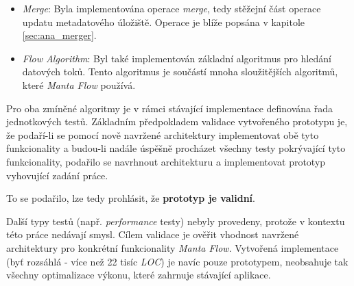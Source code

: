 \begin{itemize}
   \item{\textit{Merge}}: Byla implementována operace \textit{merge}, tedy stěžejní část operace updatu metadatového úložiště. Operace je blíže popsána v kapitole \ref{sec:ana_merger}.
   \item{\textit{Flow Algorithm}}: Byl také implementován základní algoritmus pro hledání datových toků. Tento algoritmus je součástí mnoha sloužitějších algoritmů, které \textit{Manta Flow} používá.
\end{itemize}

Pro oba zmíněné algoritmy je v rámci stávající implementace definována řada jednotkových testů. Základním předpokladem validace vytvořeného prototypu je, že podaří-li se pomocí nově navržené architektury implementovat obě tyto funkcionality a budou-li nadále úspěšně procházet všechny testy pokrývající tyto funkcionality, podařilo se navrhnout architekturu a implementovat prototyp vyhovující zadání práce.

To se podařilo, lze tedy prohlásit, že \textbf{prototyp je validní}.

Další typy testů (např. \textit{performance} testy) nebyly provedeny, protože v kontextu této práce nedávají smysl. Cílem validace je ověřit vhodnost navržené architektury pro konkrétní funkcionality \textit{Manta Flow}. Vytvořená implementace (byť rozsáhlá - více než 22 tisíc \textit{LOC}) je navíc pouze prototypem, neobsahuje tak všechny optimalizace výkonu, které zahrnuje stávající aplikace.
